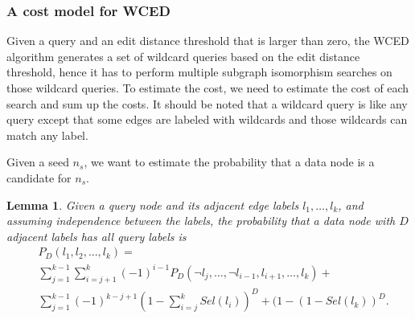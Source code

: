 \documentclass{sigmod}
\newtheorem{lemma}{Lemma}
\begin{document}
\subsubsection{A cost model for WCED}
Given a query and an edit distance threshold that is larger than zero,
the WCED algorithm generates a set of wildcard queries based on the edit distance threshold, hence it has to perform multiple subgraph isomorphism searches on those wildcard queries.
To estimate the cost, we need to estimate the cost of each search and sum up the costs. It should be noted that a wildcard query is like any query except that some edges are labeled with wildcards and those wildcards can match any label.

Given a seed $n_s$, we want to estimate the probability that a data node is a candidate for $n_s$. 

\begin {lemma}
\label{lemma:pl1-k}
Given a query node and its adjacent edge labels $l_1, \ldots, l_k$, and assuming independence between the labels, the probability that a data node with $D$ adjacent labels has all query labels is
\begin{align}
\label{eq:pl1-k}
&P_D(l_1, l_2, ..., l_k) =  \\ \nonumber
&\sum_{j=1}^{k-1} \sum_{i=j+1}^k (-1)^{i-1}P_D(\neg l_j,\ldots,\neg l_{i-1}, l_{i+1}, \ldots, l_k) +\\ \nonumber
&\sum_{j=1}^{k-1} (-1)^{k-j+1}(1-\sum_{i=j}^k Sel(l_i))^D + (1-(1-Sel(l_k))^D.
\end{align}
\end{lemma}
\end{document}
